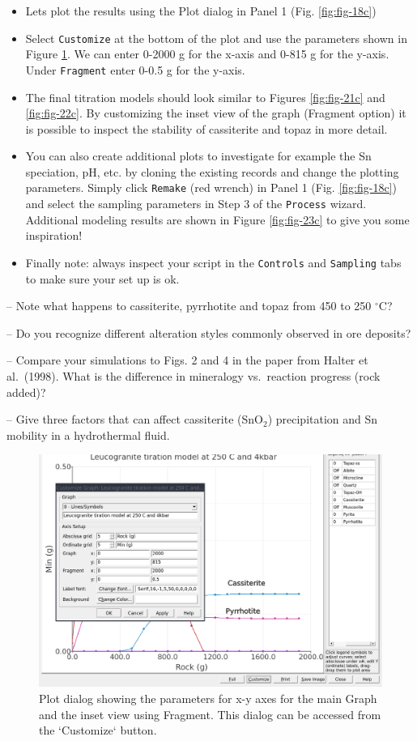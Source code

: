 \documentclass[
]{book}
\begin{document}
\begin{itemize}
\item
  Lets plot the results using the Plot dialog in Panel 1 (Fig. \ref{fig:fig-18c})
\item
  Select \texttt{Customize} at the bottom of the plot and use the parameters shown in Figure \ref{fig:fig-20c}. We can enter 0-2000 g for the x-axis and 0-815 g for the y-axis. Under \texttt{Fragment} enter 0-0.5 g for the y-axis.
\item
  The final titration models should look similar to Figures \ref{fig:fig-21c} and \ref{fig:fig-22c}. By customizing the inset view of the graph (Fragment option) it is possible to inspect the stability of cassiterite and topaz in more detail.
\item
  You can also create additional plots to investigate for example the Sn speciation, pH, etc. by cloning the existing records and change the plotting parameters. Simply click \texttt{Remake} (red wrench) in Panel 1 (Fig. \ref{fig:fig-18c}) and select the sampling parameters in Step 3 of the \texttt{Process} wizard. Additional modeling results are shown in Figure \ref{fig:fig-23c} to give you some inspiration!
\item
  Finally note: always inspect your script in the \texttt{Controls} and \texttt{Sampling} tabs to make sure your set up is ok.
\end{itemize}

-- Note what happens to cassiterite, pyrrhotite and topaz from 450 to 250 \(^\circ\)C?

-- Do you recognize different alteration styles commonly observed in ore deposits?

-- Compare your simulations to Figs. 2 and 4 in the paper from Halter et al.~(1998). What is the difference in mineralogy vs.~reaction progress (rock added)?

-- Give three factors that can affect cassiterite (SnO\(_2\)) precipitation and Sn mobility in a hydrothermal fluid.

\begin{figure}
\includegraphics[width=1\linewidth]{figures/module3/fig-20} \caption{Plot dialog showing the parameters for x-y axes for the main Graph and the inset view using Fragment. This dialog can be accessed from the `Customize` button.}\label{fig:fig-20c}
\end{figure}
\end{document}
